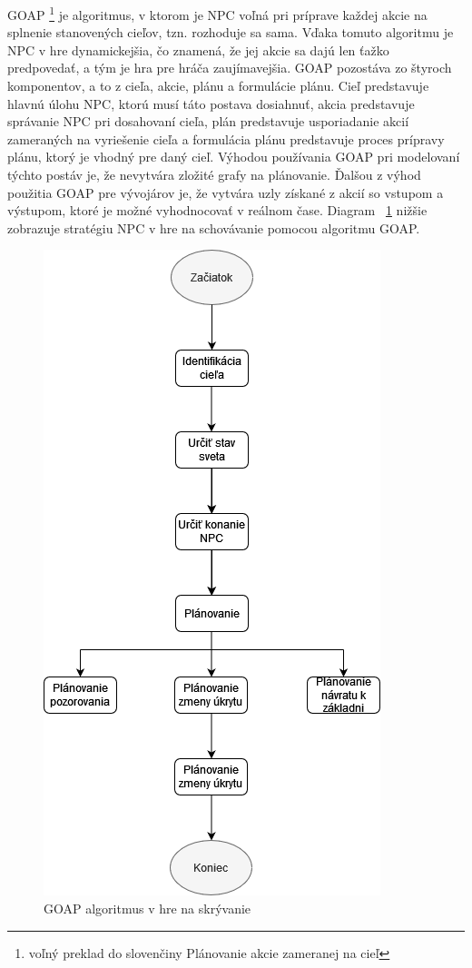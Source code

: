 \documentclass[10pt,twoside,slovak,a4paper]{article}
\begin{document}
\begin{itemize}
\quad GOAP \footnote{voľný preklad do slovenčiny Plánovanie akcie zameranej na cieľ} je algoritmus, v ktorom je NPC voľná pri príprave každej akcie na splnenie stanovených cieľov, tzn. rozhoduje sa sama. Vďaka tomuto algoritmu je NPC v hre dynamickejšia, čo znamená, že jej akcie sa dajú len ťažko predpovedať, a tým je hra pre hráča zaujímavejšia. GOAP pozostáva zo štyroch komponentov, a to z cieľa, akcie, plánu a formulácie plánu. Cieľ predstavuje hlavnú úlohu NPC, ktorú musí táto postava dosiahnuť, akcia predstavuje správanie NPC pri dosahovaní cieľa, plán predstavuje usporiadanie akcií zameraných na vyriešenie cieľa a formulácia plánu predstavuje proces prípravy plánu, ktorý je vhodný pre daný cieľ.  Výhodou používania GOAP pri modelovaní týchto postáv je, že nevytvára zložité grafy na plánovanie. Ďalšou z výhod použitia GOAP pre vývojárov je, že vytvára uzly získané z akcií so vstupom a výstupom, ktoré je možné vyhodnocovať v reálnom čase. Diagram \cite{NPC} ~\ref{f:d1} nižšie zobrazuje stratégiu NPC v hre na schovávanie pomocou algoritmu GOAP. 
\begin{figure}[tbh]
\center\includegraphics[scale=0.5]{diagram1.png}
\caption{GOAP algoritmus v hre na skrývanie}
\label{f:d1}
\end{figure}
\end{itemize}
\end{document}
